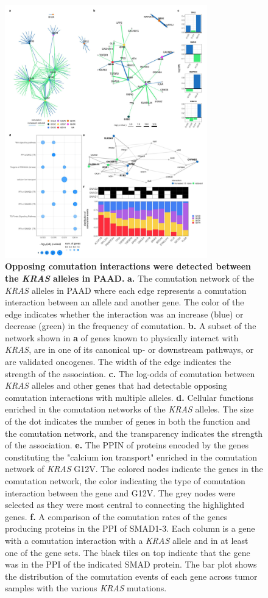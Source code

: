 \documentclass[english, 10pt, letterpaper]{article}
\newcommand{\KRAS}{\emph{KRAS}}
\begin{document}
\begin{figure}[p]
\centering
\includegraphics[height=110mm]{figures/SuppFigure_12.jpeg}
\caption{
    \textbf{Opposing comutation interactions were detected between the \KRAS{} alleles in PAAD.}
    \textbf{a.} The comutation network of the \KRAS{} alleles in PAAD where each edge represents a comutation interaction between an allele and another gene. The color of the edge indicates whether the interaction was an increase (blue) or decrease (green) in the frequency of comutation.
    \textbf{b.} A subset of the network shown in \textbf{a} of genes known to physically interact with \KRAS{}, are in one of its canonical up- or downstream pathways, or are validated oncogenes. The width of the edge indicates the strength of the association.
    \textbf{c.} The log-odds of comutation between \KRAS{} alleles and other genes that had detectable opposing comutation interactions with multiple alleles.
    \textbf{d.} Cellular functions enriched in the comutation networks of the \KRAS{} alleles. The size of the dot indicates the number of genes in both the function and the comutation network, and the transparency indicates the strength of the association.
    \textbf{e.} The PPIN of proteins encoded by the genes constituting the "calcium ion transport" enriched in the comutation network of \KRAS{} G12V. The colored nodes indicate the genes in the comutation network, the color indicating the type of comutation interaction between the gene and G12V. The grey nodes were selected as they were most central to connecting the highlighted genes.
    \textbf{f.} A comparison of the comutation rates of the genes producing proteins in the PPI of SMAD1-3. Each column is a gene with a comutation interaction with a \KRAS{} allele and in at least one of the gene sets. The black tiles on top indicate that the gene was in the PPI of the indicated SMAD protein. The bar plot shows the distribution of the comutation events of each gene across tumor samples with the various \KRAS{} mutations.
}
\label{sfig:paad-comutation}
\end{figure}
\end{document}

